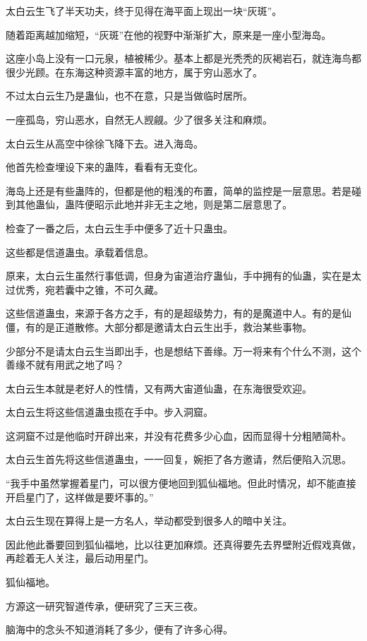 \begin{this_body}
太白云生飞了半天功夫，终于见得在海平面上现出一块“灰斑”。

随着距离越加缩短，“灰斑”在他的视野中渐渐扩大，原来是一座小型海岛。

这座小岛上没有一口元泉，植被稀少。基本上都是光秃秃的灰褐岩石，就连海鸟都很少光顾。在东海这种资源丰富的地方，属于穷山恶水了。

不过太白云生乃是蛊仙，也不在意，只是当做临时居所。

一座孤岛，穷山恶水，自然无人觊觎。少了很多关注和麻烦。

太白云生从高空中徐徐飞降下去。进入海岛。

他首先检查埋设下来的蛊阵，看看有无变化。

海岛上还是有些蛊阵的，但都是他的粗浅的布置，简单的监控是一层意思。若是碰到其他蛊仙，蛊阵便昭示此地并非无主之地，则是第二层意思了。

检查了一番之后，太白云生手中便多了近十只蛊虫。

这些都是信道蛊虫。承载着信息。

原来，太白云生虽然行事低调，但身为宙道治疗蛊仙，手中拥有的仙蛊，实在是太过优秀，宛若囊中之锥，不可久藏。

这些信道蛊虫，来源于各方之手，有的是超级势力，有的是魔道中人。有的是仙僵，有的是正道散修。大部分都是邀请太白云生出手，救治某些事物。

少部分不是请太白云生当即出手，也是想结下善缘。万一将来有个什么不测，这个善缘不就有用武之地了吗？

太白云生本就是老好人的性情，又有两大宙道仙蛊，在东海很受欢迎。

太白云生将这些信道蛊虫揽在手中。步入洞窟。

这洞窟不过是他临时开辟出来，并没有花费多少心血，因而显得十分粗陋简朴。

太白云生首先将这些信道蛊虫，一一回复，婉拒了各方邀请，然后便陷入沉思。

“我手中虽然掌握着星门，可以很方便地回到狐仙福地。但此时情况，却不能直接开启星门了，这样做是要坏事的。”

太白云生现在算得上是一方名人，举动都受到很多人的暗中关注。

因此他此番要回到狐仙福地，比以往更加麻烦。还真得要先去界壁附近假戏真做，再趁着无人关注，最后动用星门。

狐仙福地。

方源这一研究智道传承，便研究了三天三夜。

脑海中的念头不知道消耗了多少，便有了许多心得。


\end{this_body}
